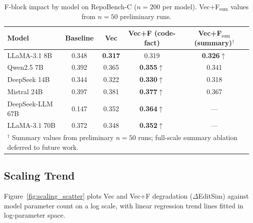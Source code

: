 \documentclass[11pt]{article}
\begin{document}
\begin{table}[h]
\centering
\caption{F-block impact by model on RepoBench-C ($n = 200$ per model). Vec+F$_\text{sum}$ values from $n = 50$ preliminary runs.}
\label{tab:fblock_ablation}
\begin{tabular}{lcccc}
\toprule
Model & Baseline & Vec & Vec+F (code-fact) & Vec+F$_\text{sum}$ (summary)$^\dagger$ \\
\midrule
LLaMA-3.1 8B    & 0.348 & \textbf{0.317} & 0.319 & \textbf{0.326}$\uparrow$ \\
Qwen2.5 7B      & 0.392 & 0.365 & \textbf{0.355}$\uparrow$ & 0.341 \\
DeepSeek 14B    & 0.344 & 0.322 & \textbf{0.330}$\uparrow$ & 0.318 \\
Mistral 24B     & 0.397 & 0.381 & \textbf{0.377}$\uparrow$ & 0.367 \\
DeepSeek-LLM 67B & 0.147 & 0.352 & \textbf{0.364}$\uparrow$ & --- \\
LLaMA-3.1 70B   & 0.372 & 0.348 & \textbf{0.352}$\uparrow$ & --- \\
\bottomrule
\multicolumn{5}{l}{\small $^\dagger$ Summary values from preliminary $n=50$ runs; full-scale summary ablation deferred to future work.}
\end{tabular}
\end{table}

\subsection{Scaling Trend}
\label{sec:scaling}

Figure~\ref{fig:scaling_scatter} plots Vec and Vec+F degradation ($\Delta$EditSim) against model parameter count on a log scale, with linear regression trend lines fitted in log-parameter space.
\end{document}
